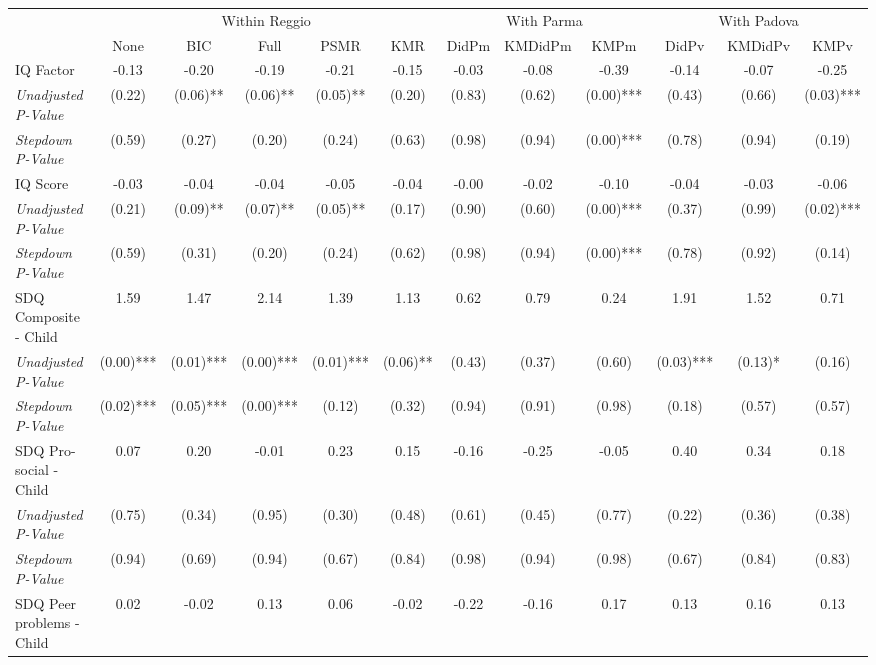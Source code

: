 \begin{tabular}{l c c c c c c c c c c c}
\toprule
& \multicolumn{5}{c}{Within Reggio} & \multicolumn{3}{c}{With Parma} & \multicolumn{3}{c}{With Padova} \\\cmidrule(lr){2-6} \cmidrule(lr){7-9} \cmidrule(lr){10-12}
 & None & BIC & Full & PSMR & KMR & DidPm & KMDidPm & KMPm & DidPv & KMDidPv & KMPv \\
\midrule
IQ Factor & -0.13 & -0.20 & -0.19 & -0.21 & -0.15 & -0.03 & -0.08 & -0.39 & -0.14 & -0.07 & -0.25 \\
\quad \textit{Unadjusted P-Value} & (0.22) & (0.06)** & (0.06)** & (0.05)** & (0.20) & (0.83) & (0.62) & (0.00)*** & (0.43) & (0.66) & (0.03)*** \\
\quad \textit{Stepdown P-Value} & (0.59) & (0.27) & (0.20) & (0.24) & (0.63) & (0.98) & (0.94) & (0.00)*** & (0.78) & (0.94) & (0.19) \\
IQ Score & -0.03 & -0.04 & -0.04 & -0.05 & -0.04 & -0.00 & -0.02 & -0.10 & -0.04 & -0.03 & -0.06 \\
\quad \textit{Unadjusted P-Value} & (0.21) & (0.09)** & (0.07)** & (0.05)** & (0.17) & (0.90) & (0.60) & (0.00)*** & (0.37) & (0.99) & (0.02)*** \\
\quad \textit{Stepdown P-Value} & (0.59) & (0.31) & (0.20) & (0.24) & (0.62) & (0.98) & (0.94) & (0.00)*** & (0.78) & (0.92) & (0.14) \\
SDQ Composite - Child & 1.59 & 1.47 & 2.14 & 1.39 & 1.13 & 0.62 & 0.79 & 0.24 & 1.91 & 1.52 & 0.71 \\
\quad \textit{Unadjusted P-Value} & (0.00)*** & (0.01)*** & (0.00)*** & (0.01)*** & (0.06)** & (0.43) & (0.37) & (0.60) & (0.03)*** & (0.13)* & (0.16) \\
\quad \textit{Stepdown P-Value} & (0.02)*** & (0.05)*** & (0.00)*** & (0.12) & (0.32) & (0.94) & (0.91) & (0.98) & (0.18) & (0.57) & (0.57) \\
SDQ Pro-social - Child & 0.07 & 0.20 & -0.01 & 0.23 & 0.15 & -0.16 & -0.25 & -0.05 & 0.40 & 0.34 & 0.18 \\
\quad \textit{Unadjusted P-Value} & (0.75) & (0.34) & (0.95) & (0.30) & (0.48) & (0.61) & (0.45) & (0.77) & (0.22) & (0.36) & (0.38) \\
\quad \textit{Stepdown P-Value} & (0.94) & (0.69) & (0.94) & (0.67) & (0.84) & (0.98) & (0.94) & (0.98) & (0.67) & (0.84) & (0.83) \\
SDQ Peer problems - Child & 0.02 & -0.02 & 0.13 & 0.06 & -0.02 & -0.22 & -0.16 & 0.17 & 0.13 & 0.16 & 0.13 \\

\end{tabular}
